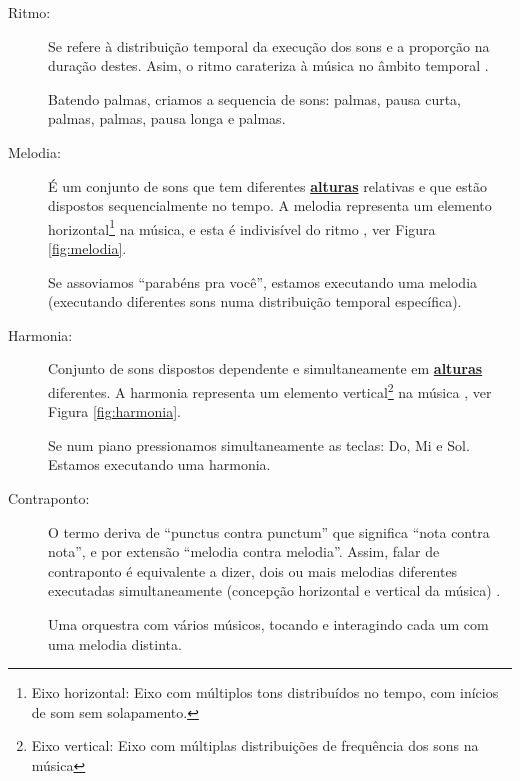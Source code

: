 \begin{description}
\item [Ritmo:] \label{sec:pos:Ritmo}
Se refere à distribuição temporal da execução dos sons e a proporção na duração destes. 
Asim, o ritmo carateriza à música no âmbito temporal \cite[pp. 11]{medteoria}.
\begin{example}
Batendo palmas, criamos a sequencia de sons: palmas, pausa curta, palmas, palmas, pausa longa e palmas.
\end{example} 
\item [Melodia:] \label{sec:pos:Melodia}
É um conjunto de sons que tem diferentes \hyperref[sec:pos:Altura]{\textbf{alturas}} relativas 
e que estão dispostos sequencialmente no tempo. 
A melodia representa um elemento horizontal\footnote{\label{eixohor}Eixo horizontal: 
Eixo com múltiplos tons distribuídos no tempo, com inícios de som sem solapamento.} na música,
e esta é indivisível do ritmo \cite[pp. 517]{apel1969harvard} \cite[pp. 11]{medteoria}, ver Figura \ref{fig:melodia}.
\begin{example}
Se assoviamos ``parabéns pra você'', estamos executando uma melodia 
(executando diferentes sons numa distribuição temporal específica).
\end{example} 
\item [Harmonia:] \label{sec:pos:Harmonia}
Conjunto de sons dispostos dependente e simultaneamente em \hyperref[sec:pos:Altura]{\textbf{alturas}} diferentes.
A harmonia representa um elemento vertical\footnote{\label{eixover}Eixo vertical: 
Eixo com múltiplas distribuições de frequência dos sons na música} 
na música \cite[pp. 371]{apel1969harvard} \cite[pp. 8]{cardoso1973curso} \cite[pp. 11]{medteoria}, 
ver Figura \ref{fig:harmonia}. 
\begin{example}
Se num piano pressionamos simultaneamente as teclas: Do, Mi e Sol. Estamos executando uma harmonia.
\end{example} 
\item [Contraponto:] \label{sec:pos:Contraponto}
O termo deriva de ``punctus contra punctum'' que significa ``nota contra nota'', 
e por extensão ``melodia contra melodia''. 
Assim, falar de contraponto é equivalente a dizer, dois ou mais melodias diferentes executadas simultaneamente  
(concepção horizontal e vertical da música)  \cite[pp. 208]{apel1969harvard} \cite[pp. 11]{medteoria}.
\begin{example}
Uma orquestra com vários músicos, tocando e interagindo cada um com uma melodia distinta.
\end{example} 
\end{description}


